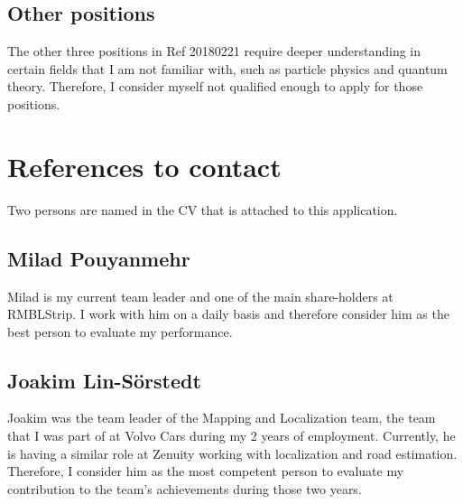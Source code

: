 \documentclass[12pt]{article}
\begin{document}
\subsection*{Other positions}
The other three positions in Ref 20180221 require deeper understanding in certain fields that I am not familiar with, such as particle physics and quantum theory. Therefore, I consider myself not qualified enough to apply for those positions.

\section*{References to contact}
Two persons are named in the CV that is attached to this application.

\subsection*{Milad Pouyanmehr}
Milad is my current team leader and one of the main share-holders at RMBLStrip. I work with him on a daily basis and therefore consider him as the best person to evaluate my performance.

\subsection*{Joakim Lin-S\"orstedt}
Joakim was the team leader of the Mapping and Localization team, the team that I was part of at Volvo Cars during my 2 years of employment. Currently, he is having a similar role at Zenuity working with localization and road estimation. Therefore, I consider him as the most competent person to evaluate my contribution to the team's achievements during those two years.



\end{document}
